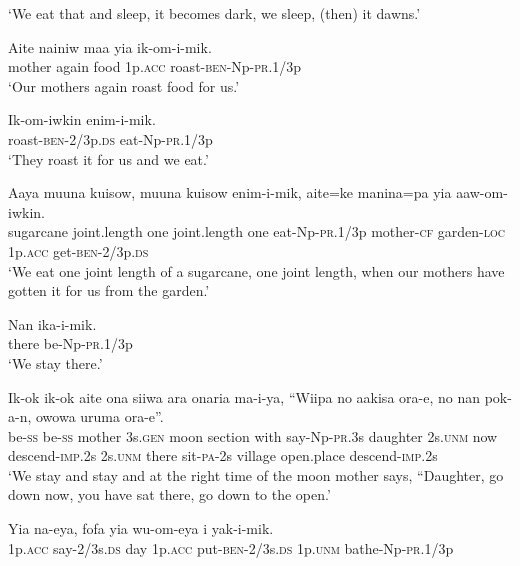 \glt ‘We eat that and sleep, it becomes dark, we sleep, (then) it dawns.’ \\
\z


\ea
\gll  Aite  nainiw  maa  yia  ik-om-i-mik. \\
mother  again  food  1p.\textsc{acc}  roast-\textsc{ben}-Np-\textsc{pr}.1/3p \\
\glt ‘Our mothers again roast food for us.’ \\
\z


\ea
\gll  Ik-om-iwkin  enim-i-mik. \\
roast-\textsc{ben}-2/3p.\textsc{ds}  eat-Np-\textsc{pr}.1/3p \\
\glt ‘They roast it for us and we eat.’ \\
\z


\ea
\gll  Aaya  muuna  kuisow,  muuna  kuisow  enim-i-mik,  aite=ke             manina=pa  yia  aaw-om-iwkin. \\
sugarcane  joint.length  one  joint.length  one  eat-Np-\textsc{pr}.1/3p  mother-\textsc{cf}  garden-\textsc{loc}  1p.\textsc{acc}  get-\textsc{ben}-2/3p.\textsc{ds} \\


\glt ‘We eat one joint length of a sugarcane, one joint length, when our mothers have gotten it for us from the garden.’ \\
\z


\ea
\gll  Nan  ika-i-mik. \\
there  be-Np-\textsc{pr}.1/3p \\
\glt ‘We stay there.’ \\
\z


\ea
\gll  Ik-ok  ik-ok  aite  ona  siiwa  ara  onaria  ma-i-ya,  “Wiipa       no  aakisa  ora-e,  no  nan  pok-a-n,  owowa  uruma                         ora-e”. \\
be-\textsc{ss}  be-\textsc{ss}  mother  3s.\textsc{gen}  moon  section  with  say-Np-\textsc{pr}.3s  daughter 2s.\textsc{unm}  now  descend-\textsc{imp}.2s  2s.\textsc{unm}  there  sit-\textsc{pa}-2s  village  open.place  descend-\textsc{imp}.2s \\




\glt ‘We stay and stay and at the right time of the moon mother says, “Daughter, go down now, you have sat there, go down to the open.’ \\
\z


\ea
\gll  Yia  na-eya,  fofa  yia  wu-om-eya          i  yak-i-mik. \\
1p.\textsc{acc}  say-2/3s.\textsc{ds}  day  1p.\textsc{acc}  put-\textsc{ben}-2/3s.\textsc{ds} 1p.\textsc{unm}  bathe-Np-\textsc{pr}.1/3p \\


